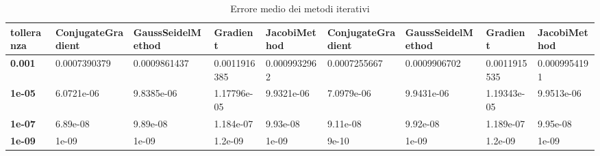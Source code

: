 \begin{table}[!ht]
\begin{subtable}[!ht]{1\textwidth}
{\begin{tabular}{@{}lllll|llll@{}}
                \textbf{tolleranza} & \textbf{ConjugateGradient}         & \textbf{GaussSeidelMethod}        & \textbf{Gradient} & \textbf{JacobiMethod} & \textbf{ConjugateGradient} & \textbf{GaussSeidelMethod} & \textbf{Gradient} & \textbf{JacobiMethod} \\ \midrule
                \textbf{0.001}      & 0.0007390379                       & 0.0009861437                      & 0.0011916385      & 0.0009932962          & 0.0007255667               & 0.0009906702               & 0.0011915535      & 0.0009954191          \\
                \textbf{1e-05}      & 6.0721e-06                         & 9.8385e-06                        & 1.17796e-05       & 9.9321e-06            & 7.0979e-06                 & 9.9431e-06                 & 1.19343e-05       & 9.9513e-06            \\
                \textbf{1e-07}      & 6.89e-08                           & 9.89e-08                          & 1.184e-07         & 9.93e-08              & 9.11e-08                   & 9.92e-08                   & 1.189e-07         & 9.95e-08              \\
                \textbf{1e-09}      & 1e-09                              & 1e-09                             & 1.2e-09           & 1e-09                 & 9e-10                      & 1e-09                      & 1.2e-09           & 1e-09                 \\ \bottomrule
            \end{tabular}}
        \caption{Vem 1 e Vem 2}
        \label{tab:vem_error}
    \end{subtable}
    \caption{Errore medio dei metodi iterativi}
    \label{tab:erors}
\end{table}
